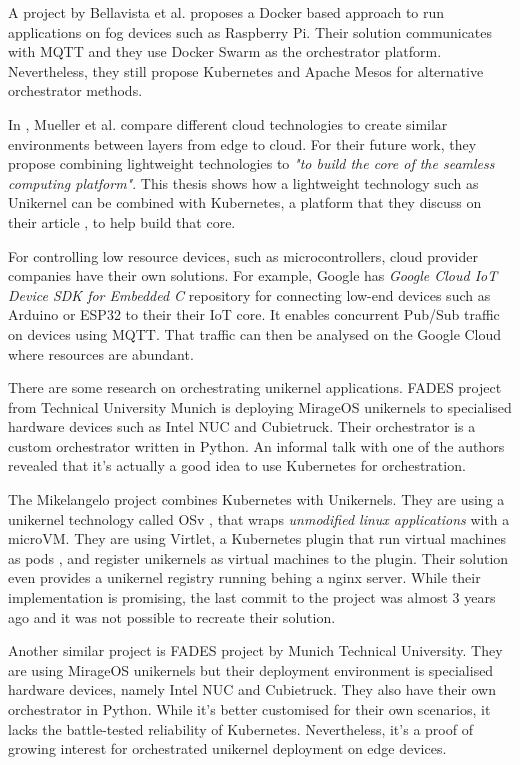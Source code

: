 A project by Bellavista et al. \cite{Bellavista2017} proposes a Docker based approach to run applications on fog devices such as Raspberry Pi. Their solution communicates with MQTT and they use Docker Swarm as the orchestrator platform. Nevertheless, they still propose Kubernetes and Apache Mesos for alternative orchestrator methods.

In \cite{Mueller2017} , Mueller et al. compare different cloud technologies to create similar environments between layers from edge to cloud. For their future work, they propose combining lightweight technologies to \textit{"to build the core of the seamless computing platform"}. This thesis shows how a lightweight technology such as Unikernel can be combined with Kubernetes, a platform that they discuss on their article , to help build that core.

For controlling low resource devices, such as microcontrollers, cloud provider companies have their own solutions. For example, Google has \textit{Google Cloud IoT Device SDK for Embedded C} repository for connecting low-end devices such as Arduino or ESP32 to their their IoT core. It enables concurrent Pub/Sub traffic on devices using MQTT. That traffic can then be analysed on the Google Cloud where resources are abundant.

There are some research on orchestrating unikernel applications. FADES project \cite{fades} from Technical University Munich is deploying MirageOS unikernels to specialised hardware devices such as Intel NUC and Cubietruck. Their orchestrator is a custom orchestrator written in Python. An informal talk with one of the authors revealed that it's actually a good idea to use Kubernetes for orchestration.

The Mikelangelo project \cite{Struckmann2018} combines Kubernetes with Unikernels. They are using a unikernel technology called OSv \cite{osv}, that wraps \textit{unmodified linux applications} with a microVM. They are using Virtlet, a Kubernetes plugin that run virtual machines as pods , and register unikernels as virtual machines to the plugin. Their solution even provides a unikernel registry running behing a nginx server. While their implementation is promising, the last commit to the project was almost 3 years ago and it was not possible to recreate their solution.



\iffalse

Another similar project is FADES \cite{fades} project by Munich Technical University. They are using MirageOS unikernels but their deployment environment is specialised hardware devices, namely Intel NUC and Cubietruck. They also have their own orchestrator in Python. While it's better customised for their own scenarios, it lacks the battle-tested reliability of Kubernetes. Nevertheless, it's a proof of growing interest for orchestrated unikernel deployment on edge devices.


